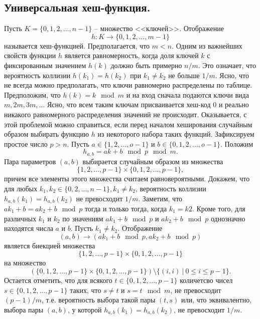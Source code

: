 \subsection{Универсальная хеш-функция.}
Пусть $K = \{0,1,2,...,n-1\}$ -- множество <<ключей>>. Отображение
\[
h: K \to \{0,1,2,...,m-1\}
\]
называется хеш-функцией. Предполагается, что $m < n$. Одним из важнейших свойств функции $h$ является равномерность, когда доля ключей $k$ с фиксированным значением $h(k)$ должно быть примерно $n/m$.  Это означает, что вероятность коллизии $h(k_1) = h(k_2)$ при $k_1 \neq k_2$ не больше $1/m$. Ясно, что не всегда можно предполагать, что ключи равномерно распределены по таблице. Предположим, что $h(k) = k \mod{m}$ и на вход сначала подаются ключи вида $m, 2m, 3m, ...$ Ясно, что всем таким ключам присваивается хеш-код 0 и реально никакого равномерного распределения значений не происходит. Оказывается, с этой проблемой можно справиться, если перед началом хеширования случайным образом выбирать функцию $h$ из некоторого набора таких функций.
\newline
Зафиксируем простое число $p > n$. Пусть $a \in \{1,2,...,o-1\}$ и $b \in \{0,1,2,...,o-1\}$. Положим $$h_{a,b} = ak + b \mod{p} \mod{m}.$$
Пара параметров $(a,b)$ выбирается случайным образом из множества $$\{1,2,...,p-1\} \times \{0,1,2,...,p-1\},$$ причем все элементы этого множества считаем равновероятными. Докажем, что для любых $k_1, k_2 \in \{0,2,...,n-1\}, k_1 \neq k_2$, вероятность коллизии $h_{a,b}(k_1) = h_{a,b}(k_2)$ не превосходит $1/m$.
\newline
Заметим, что $ak_1 + b = ak_2 + b \mod{p}$ тогда и только тогда, когда $k_1 = k2$. Кроме того, для различных $k_1$ и $k_2$ по значениям $ak_1 + b \mod{p}$ и $ak_2 + b \mod{p}$ однозначно находятся числа $a$ и $b$. Пусть $k_1 \neq k_2$. Отображение
$$(a,b) \to (ak_1 + b \mod{p}, ak_2 + b \mod{p})$$ является биекцией множества
$$\{1,2,...,p-1\} \times \{0,1,2,...,p-1\}$$ на множество 
$$(\{0, 1,2,...,p-1\} \times \{0,1,2,...,p-1\}) \setminus \{(i, i) \> | \> 0 \leqslant i \leqslant p - 1 \}.$$ Остается отметить, что для всякого $t \in \{0,1,2,...,p-1\}$ количетсво чисел $s \in \{0,1,2,...,p-1\}$ таких, что $s \neq t$ и $s = t \mod{m}$, не превосходит $(p-1)/m$, т.е. вероятность выбора такой пары $(t,s)$ или, что эквивалентно, выбора пары $(a,b)$, у которой $h_{a,b}(k_1) = h_{a,b}(k_2)$, не превосходит $1/m$.